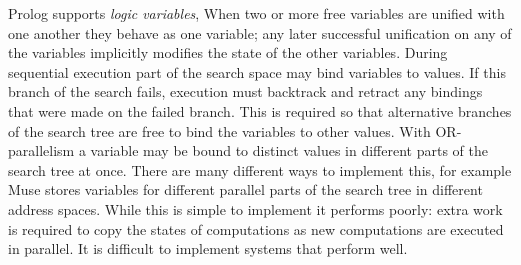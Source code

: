 
Prolog supports \emph{logic variables},
When two or more free variables are unified with one another they behave as one
variable;
any later successful unification on any of the variables implicitly modifies
the state of the other variables.
During sequential execution
part of the search space may bind variables to values.
If this branch of the search fails,
execution must backtrack and retract any bindings that were made on the
failed branch.
This is required so that alternative
branches of the search tree are free to bind the variables to other values.
With OR-parallelism a variable may be bound to distinct values in different
parts of the search tree at once.
There are many different ways to implement this,
for example Muse stores variables for different parallel parts of the search
tree in different address spaces.
While this is simple to implement it performs poorly:
extra work is required to copy the states of computations as new
computations are executed in parallel.
It is difficult to implement systems that perform well.

